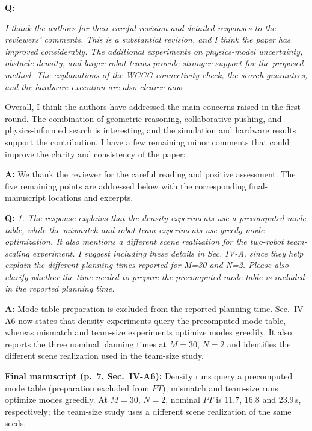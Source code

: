 \documentclass[11pt]{article}
\newcommand{\change}[1]{{\color{blue}#1}}
\begin{document}
\begin{shaded*}
\noindent \textbf{Q:}
{\itshape
I thank the authors for their careful revision and detailed responses
to the reviewers' comments. This is a substantial revision, and I think
the paper has improved considerably. The additional experiments on
physics-model uncertainty, obstacle density, and larger robot teams
provide stronger support for the proposed method. The explanations of
the WCCG connectivity check, the search guarantees, and the hardware
execution are also clearer now.

Overall, I think the authors have addressed the main concerns raised in
the first round. The combination of geometric reasoning, collaborative
pushing, and physics-informed search is interesting, and the simulation
and hardware results support the contribution. I have a few remaining
minor comments that could improve the clarity and consistency of the
paper:
}
\end{shaded*}

\noindent \textbf{A:}
We thank the reviewer for the careful reading and positive assessment. The
five remaining points are addressed below with the corresponding final-manuscript
locations and excerpts.


\begin{shaded*}
\noindent \textbf{Q:}
{\itshape
1. The response explains that the density experiments use a precomputed
mode table, while the mismatch and robot-team experiments use greedy
mode optimization. It also mentions a different scene realization for
the two-robot team-scaling experiment. I suggest including these
details in Sec. IV-A, since they help explain the different planning
times reported for M=30 and N=2. Please also clarify whether the time
needed to prepare the precomputed mode table is included in the
reported planning time.
}
\end{shaded*}

\noindent \textbf{A:}
Mode-table preparation is excluded from the reported planning time.
Sec.~IV-A6 now states that density experiments query the precomputed mode table,
whereas mismatch and team-size experiments optimize modes greedily. It also
reports the three nominal planning times at $M=30$, $N=2$ and identifies the
different scene realization used in the team-size study.
\par\smallskip\noindent\textbf{Final manuscript (p.~7, Sec.~IV-A6):}
\change{Density runs query a precomputed mode table (preparation excluded from $PT$);
mismatch and team-size runs optimize modes greedily. At $M{=}30$, $N{=}2$,
nominal $PT$ is $11.7$, $16.8$ and $23.9$\,s, respectively; the team-size
study uses a different scene realization of the same seeds.}
\end{document}
